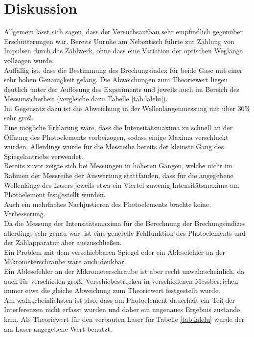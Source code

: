\section{Diskussion}
\label{sec:Diskussion}
Allgemein lässt sich sagen, dass der Versuchsaufbau sehr empfindlich gegenüber Erschütterungen war. Bereits Unruhe am Nebentisch führte zur Zählung von Impulsen durch das Zählwerk, ohne dass eine Variation der optischen Weglänge vollzogen wurde.
\\Auffällig ist, dass die Bestimmung des Brechungsindex für beide Gase mit einer sehr hohen Genauigkeit gelang. Die Abweichungen zum Theoriewert liegen deutlich unter der Auflösung des Experiments und jeweils auch im Bereich des Messunsicherheit (vergleiche dazu Tabelle \ref{tab:lalelu}).
\\Im Gegensatz dazu ist die Abweichung in der Wellenlängenmessung mit über $30\%$ sehr groß.
\\Eine mögliche Erklärung wäre, dass die Intensitätsmaxima zu schnell an der Öffnung des Photoelements vorbeizogen, sodass einige Maxima verschluckt wurden. Allerdings wurde für die Messreihe bereits der kleinste Gang des Spiegelantriebs verwendet.
\\Bereits zuvor zeigte sich bei Messungen in höheren Gängen, welche nicht im Rahmen der Messreihe der Auswertung stattfanden, dass für die angegebene Wellenlänge des Lasers jeweils etwa ein Viertel zuwenig Intensitätsmaxima am Photoelement festgestellt wurden. \\Auch ein mehrfaches Nachjustieren des Photoelements brachte keine Verbesserung.
\\Da die Messung der Intensitätsmaxima für die Berechnung der Brechungsindizes allerdings sehr genau war, ist eine generelle Fehlfunktion des Photoelements und der Zählapparatur aber auszuschließen. \\
Ein Problem mit dem verschiebbaren Spiegel oder ein Ablesefehler an der Mikrometerschraube wäre auch denkbar.\\
Ein Ablesefehler an der Mikrometerschraube ist aber recht unwahrscheinlich, da auch für verschieden große Verschiebestrecken in verschiedenen Messbereichen immer etwa die gleiche Abweichung zum Theoriewert festgestellt wurde.\\
Am wahrscheinlichsten ist also, dass am Photoelement dauerhaft ein Teil der Interferenzen nicht erfasst wurden und daher ein ungenaues Ergebnis zustande kam.
Als Theoriewert für den verbauten Laser für Tabelle \ref{tab:lalelu} wurde der am Laser angegebene Wert benutzt.
